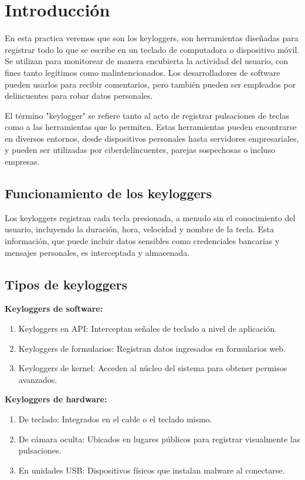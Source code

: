 \singlespacing
\section{Introducción}

En esta practica veremos que son los keyloggers, son herramientas diseñadas para registrar todo lo que se escribe en un teclado de computadora o dispositivo móvil. Se utilizan para monitorear de manera encubierta la actividad del usuario, con fines tanto legítimos como malintencionados. Los desarrolladores de software pueden usarlos para recibir comentarios, pero también pueden ser empleados por delincuentes para robar datos personales.

El término "keylogger" se refiere tanto al acto de registrar pulsaciones de teclas como a las herramientas que lo permiten. Estas herramientas pueden encontrarse en diversos entornos, desde dispositivos personales hasta servidores empresariales, y pueden ser utilizadas por ciberdelincuentes, parejas sospechosas o incluso empresas.

\subsection{Funcionamiento de los keyloggers}

Los keyloggers registran cada tecla presionada, a menudo sin el conocimiento del usuario, incluyendo la duración, hora, velocidad y nombre de la tecla. Esta información, que puede incluir datos sensibles como credenciales bancarias y mensajes personales, es interceptada y almacenada.

\subsection{Tipos de keyloggers}

\textbf{Keyloggers de software:}

\begin{enumerate}
    \item Keyloggers en API: Interceptan señales de teclado a nivel de aplicación.
    \item Keyloggers de formularios: Registran datos ingresados en formularios web.
    \item Keyloggers de kernel: Acceden al núcleo del sistema para obtener permisos avanzados.
\end{enumerate}

\textbf{Keyloggers de hardware:}

\begin{enumerate}
    \item De teclado: Integrados en el cable o el teclado mismo.
    \item De cámara oculta: Ubicados en lugares públicos para registrar visualmente las pulsaciones.
    \item En unidades USB: Dispositivos físicos que instalan malware al conectarse.
\end{enumerate}